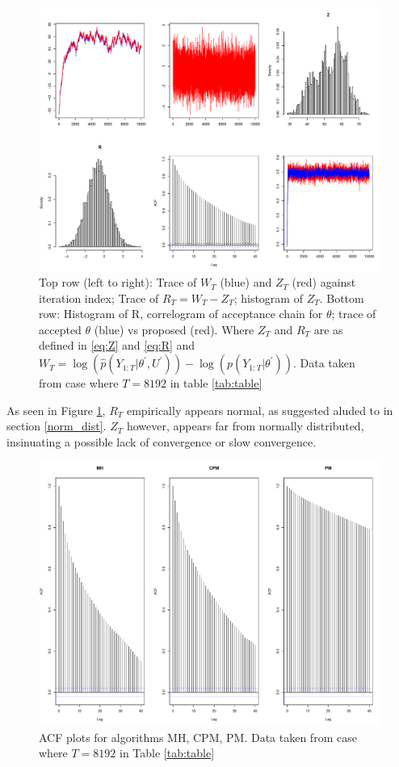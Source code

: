 \documentclass{article}
\begin{document}
\begin{figure}[H]
  \centerline{\includegraphics[scale=1]{experi1_plots}}
  \caption{Top row (left to right): Trace of $W_T$ (blue) and $Z_T$ (red) against iteration index; Trace of $R_T=W_T-Z_T$; histogram of $Z_T$.  Bottom row: Histogram of R, correlogram of acceptance chain for $\theta$; trace of accepted $\theta$ (blue) vs proposed (red). Where $Z_T$ and $R_T$ are as defined in \eqref{eq:Z} and \eqref{eq:R} and $W_T = \log(\hat{p}(Y_{1:T}| \theta^\prime, U^\prime)) - \log(p(Y_{1:T}|\theta^\prime))$. Data taken from case where $T=8192$ in table \ref{tab:table}}
   \label{fig:theFig}
\end{figure}

As seen in Figure \ref{fig:theFig}, $R_T$ empirically appears normal, as suggested aluded to in section \ref{norm_dist}. $Z_T$ however, appears far from normally distributed, insinuating a possible lack of convergence or slow convergence.

\begin{figure}[H]
  \centerline{\includegraphics[scale=1]{acf_plots}}
  \caption{ACF plots for algorithms MH, CPM, PM. Data taken from case where $T=8192$ in Table \ref{tab:table}}
    \label{fig:acf}
\end{figure}
\end{document}
